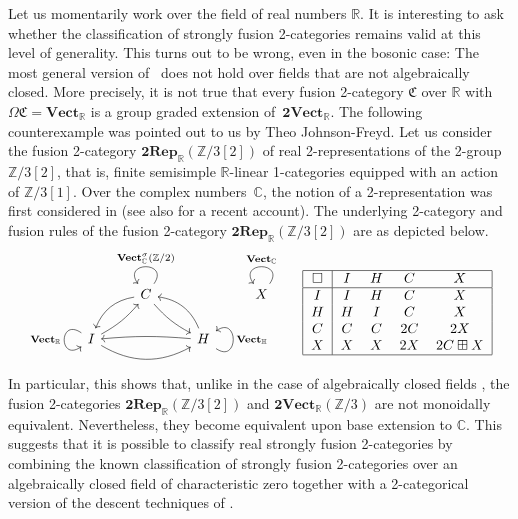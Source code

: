 \documentclass[pdftex]{sigma}
\numberwithin{equation}{section}
\begin{document}
\begin{Remark}
Let us momentarily work over the field of real numbers $\mathbb{R}$. It is interesting to ask whether the classification of strongly fusion 2-categories remains valid at this level of generality. This turns out to be wrong, even in the bosonic case: The most general version of~\cite[Theorem~A]{JFY} does not hold over fields that are not algebraically closed. More precisely, it is not true that every fusion 2-category $\mathfrak{C}$ over $\mathbb{R}$ with $\Omega\mathfrak{C} = \mathbf{Vect}_{\mathbb{R}}$ is a group graded extension of~$\mathbf{2Vect}_{\mathbb{R}}$. The following counterexample was pointed out to us by Theo Johnson-Freyd. Let us consider the fusion 2-category $\mathbf{2Rep}_{\mathbb{R}}(\mathbb{Z}/3[2])$ of real 2-representations of the 2-group $\mathbb{Z}/3[2]$, that is, finite semisimple $\mathbb{R}$-linear 1-categories equipped with an action of $\mathbb{Z}/3[1]$. Over the complex numbers~$\mathbb{C}$, the notion of a 2-representation was first considered in \cite[Section 6]{El2} (see also \cite[Section 1.4.5]{DR} for a recent account). The underlying 2-category and fusion rules of the fusion 2-category $\mathbf{2Rep}_{\mathbb{R}}(\mathbb{Z}/3[2])$ are as depicted below.
 \begin{displaymath}
\begin{tabular}{c c}
$\begin{tikzcd}
& C \arrow[ld, bend right] \arrow[rd, bend right = 10] \arrow["\mathbf{Vect}^{\sigma}_{\mathbb{C}}(\mathbb{Z}/2)"', loop, distance=2em, in=125, out=55] & & X \arrow["\mathbf{Vect}_{\mathbb{C}}"', loop, distance=2em, in=125, out=55] \\
I \arrow[rr, bend right] \arrow[ru, bend right = 10] \arrow["\mathbf{Vect}_{\mathbb{R}}"', loop, distance=2em, in=215, out=145] & & H \arrow[lu, bend right] \arrow[ll, bend right = 5] \arrow["\mathbf{Vect}_{\mathbb{H}}"', loop, distance=2em, in=35, out=325] & \end{tikzcd}$&$\begin{tabular}{ |c| c c c c | }
 \hline
 $\Box$ & $I$ & $H$ & $C$ & $X$\\
 \hline
 $I$ & $I$ & $H$ & $C$ & $X$\\
 $H$ & $H$ & $I$ & $C$ & $X$\\
 $C$ & $C$ & $C$ & $2C$ & $2X$\\
 $X$ & $X$ & $X$ & $2X$ & $2C\boxplus X$\\
 \hline
\end{tabular}$
\end{tabular}\end{displaymath}
In particular, this shows that, unlike in the case of algebraically closed fields \cite[Example~1.4.22]{DR}, the fusion 2-categories $\mathbf{2Rep}_{\mathbb{R}}(\mathbb{Z}/3[2])$ and $\mathbf{2Vect}_{\mathbb{R}}(\mathbb{Z}/3)$ are not monoidally equivalent. Nevertheless, they become equivalent upon base extension to $\mathbb{C}$. This suggests that it is possible to classify real strongly fusion 2-categories by combining the known classification of strongly fusion 2-categories over an algebraically closed field of characteristic zero together with a 2-categorical version of the descent techniques of \cite{EG}.
\end{Remark}
\end{document}
